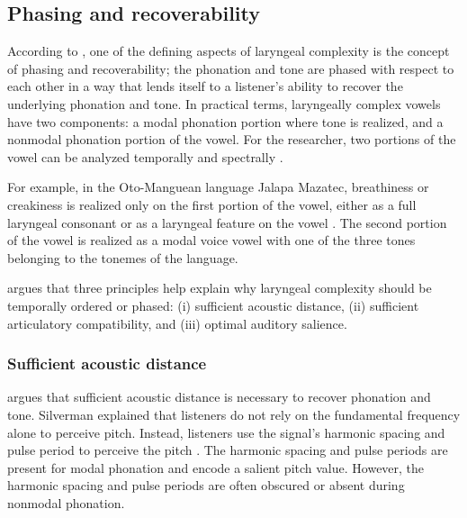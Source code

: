\subsection{Phasing and recoverability}\label{sec:phasing_and_recoverability}

According to \citet{silvermanLaryngealComplexityOtomanguean1997,silvermanPhasingRecoverability1997}, one of the defining aspects of laryngeal complexity is the concept of phasing and recoverability; the phonation and tone are phased with respect to each other in a way that lends itself to a listener's ability to recover the underlying phonation and tone. In practical terms, laryngeally complex vowels have two components: a modal phonation portion where tone is realized, and a nonmodal phonation portion of the vowel. For the researcher, two portions of the vowel can be analyzed temporally and spectrally \citep[237]{silvermanLaryngealComplexityOtomanguean1997}.

For example, in the Oto-Manguean language Jalapa Mazatec, breathiness or creakiness is realized only on the first portion of the vowel, either as a full laryngeal consonant or as a laryngeal feature on the vowel \citep[238]{silvermanLaryngealComplexityOtomanguean1997}. The second portion of the vowel is realized as a modal voice vowel with one of the three tones belonging to the tonemes of the language.

\citeauthor{silvermanLaryngealComplexityOtomanguean1997} argues that three principles help explain why laryngeal complexity should be temporally ordered or phased: (i) sufficient acoustic distance, (ii) sufficient articulatory compatibility, and (iii) optimal auditory salience. 

\subsubsection{Sufficient acoustic distance}\label{sec:sufficient_acoustic_distance}

\citet{silvermanLaryngealComplexityOtomanguean1997} argues that sufficient acoustic distance is necessary to recover phonation and tone. Silverman explained that listeners do not rely on the fundamental frequency alone to perceive pitch. Instead, listeners use the signal's harmonic spacing and pulse period to perceive the pitch \citep{ritsmaFrequenciesDominantPerception1967,remezIntonationSinusoidalSentences1993}. The harmonic spacing and pulse periods are present for modal phonation and encode a salient pitch value. However, the harmonic spacing and pulse periods are often obscured or absent during nonmodal phonation.

